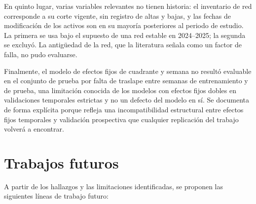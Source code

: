 En quinto lugar, varias variables relevantes no tienen historia: el inventario de red corresponde a su corte vigente, sin registro de altas y bajas, y las fechas de modificación de los activos son en su mayoría posteriores al periodo de estudio. La primera se usa bajo el supuesto de una red estable en 2024--2025; la segunda se excluyó. La antigüedad de la red, que la literatura señala como un factor de falla, no pudo evaluarse.

Finalmente, el modelo de efectos fijos de cuadrante y semana no resultó evaluable en el conjunto de prueba por falta de traslape entre semanas de entrenamiento y de prueba, una limitación conocida de los modelos con efectos fijos dobles en validaciones temporales estrictas y no un defecto del modelo en sí. Se documenta de forma explícita porque refleja una incompatibilidad estructural entre efectos fijos temporales y validación prospectiva que cualquier replicación del trabajo volverá a encontrar.

\section{Trabajos futuros}
\label{sec:trabajo-futuro}

A partir de los hallazgos y las limitaciones identificadas, se proponen las siguientes líneas de trabajo futuro:


